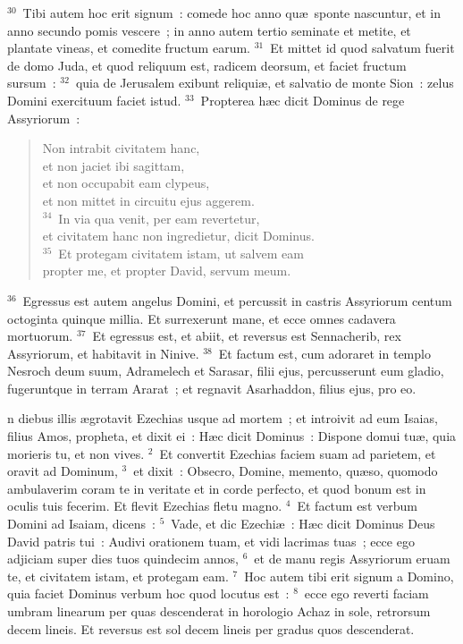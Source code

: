 ${}^{30}$~Tibi autem hoc erit signum~: comede hoc anno qu\ae\ sponte nascuntur, et in anno secundo pomis vescere~; in anno autem tertio seminate et metite, et plantate vineas, et comedite fructum earum.
${}^{31}$~Et mittet id quod salvatum fuerit de domo Juda, et quod reliquum est, radicem deorsum, et faciet fructum sursum~:
${}^{32}$~quia de Jerusalem exibunt reliqui\ae , et salvatio de monte Sion~: zelus Domini exercituum faciet istud.
${}^{33}$~Propterea h\ae c dicit Dominus de rege Assyriorum~: \begin{verse}Non intrabit civitatem hanc,\\ et non jaciet ibi sagittam,\\ et non occupabit eam clypeus,\\ et non mittet in circuitu ejus aggerem.\\
${}^{34}$~In via qua venit, per eam revertetur,\\ et civitatem hanc non ingredietur, dicit Dominus.\\
${}^{35}$~Et protegam civitatem istam, ut salvem eam\\ propter me, et propter David, servum meum.\end{verse}


${}^{36}$~Egressus est autem angelus Domini, et percussit in castris Assyriorum centum octoginta quinque millia. Et surrexerunt mane, et ecce omnes cadavera mortuorum.
${}^{37}$~Et egressus est, et abiit, et reversus est Sennacherib, rex Assyriorum, et habitavit in Ninive.
${}^{38}$~Et factum est, cum adoraret in templo Nesroch deum suum, Adramelech et Sarasar, filii ejus, percusserunt eum gladio, fugeruntque in terram Ararat~; et regnavit Asarhaddon, filius ejus, pro eo.

\bchapter
{}n diebus illis \ae grotavit Ezechias usque ad mortem~; et introivit ad eum Isaias, filius Amos, propheta, et dixit ei~: H\ae c dicit Dominus~: Dispone domui tu\ae , quia morieris tu, et non vives.
${}^{2}$~Et convertit Ezechias faciem suam ad parietem, et oravit ad Dominum,
${}^{3}$~et dixit~: Obsecro, Domine, memento, qu\ae so, quomodo ambulaverim coram te in veritate et in corde perfecto, et quod bonum est in oculis tuis fecerim. Et flevit Ezechias fletu magno.
${}^{4}$~Et factum est verbum Domini ad Isaiam, dicens~:
${}^{5}$~Vade, et dic Ezechi\ae~: H\ae c dicit Dominus Deus David patris tui~: Audivi orationem tuam, et vidi lacrimas tuas~; ecce ego adjiciam super dies tuos quindecim annos,
${}^{6}$~et de manu regis Assyriorum eruam te, et civitatem istam, et protegam eam.
${}^{7}$~Hoc autem tibi erit signum a Domino, quia faciet Dominus verbum hoc quod locutus est~:
${}^{8}$~ecce ego reverti faciam umbram linearum per quas descenderat in horologio Achaz in sole, retrorsum decem lineis. Et reversus est sol decem lineis per gradus quos descenderat.


